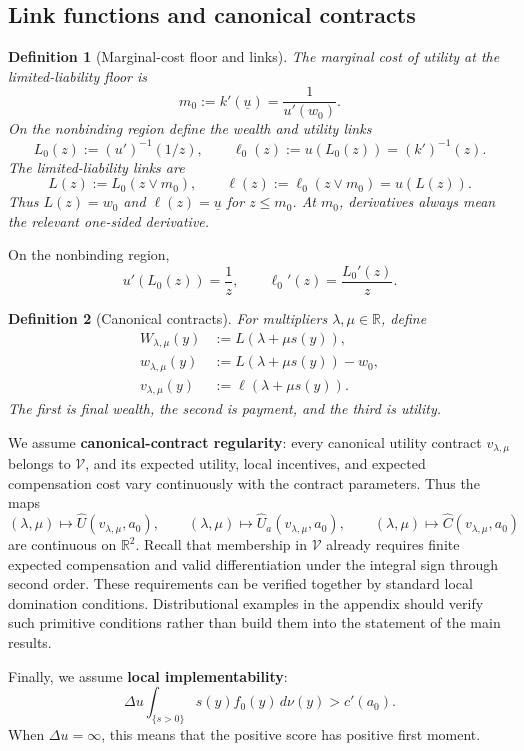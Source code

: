 \documentclass[11pt]{article}
\newtheorem{definition}{Definition}
\theoremstyle{remark}
\newcommand{\R}{\mathbb R}
\newcommand{\dd}{\,d\nu}
\begin{document}
\subsection{Link functions and canonical contracts}

\begin{definition}[Marginal-cost floor and links]
The marginal cost of utility at the limited-liability floor is
\[
 m_0:=k'(\underline u)=\frac{1}{u'(w_0)}.
\]
On the nonbinding region define the wealth and utility links
\[
 L_0(z):=(u')^{-1}(1/z),
 \qquad
 \ell_0(z):=u(L_0(z))=(k')^{-1}(z).
\]
The limited-liability links are
\[
 L(z):=L_0(z\vee m_0),
 \qquad
 \ell(z):=\ell_0(z\vee m_0)=u(L(z)).
\]
Thus $L(z)=w_0$ and $\ell(z)=\underline u$ for $z\le m_0$.
At $m_0$, derivatives always mean the relevant one-sided derivative.
\end{definition}

On the nonbinding region,
\[
 u'(L_0(z))=\frac1z,
 \qquad
 \ell_0'(z)=\frac{L_0'(z)}{z}.
\]

\begin{definition}[Canonical contracts]
For multipliers $\lambda,\mu\in\R$, define
\begin{align*}
 W_{\lambda,\mu}(y)&:=L(\lambda+\mu s(y)),\\
 w_{\lambda,\mu}(y)&:=L(\lambda+\mu s(y))-w_0,\\
 v_{\lambda,\mu}(y)&:=\ell(\lambda+\mu s(y)).
\end{align*}
The first is final wealth, the second is payment, and the third is utility.
\end{definition}

We assume \textbf{canonical-contract regularity}: every canonical utility
contract $v_{\lambda,\mu}$ belongs to $\mathcal V$, and its expected utility,
local incentives, and expected compensation cost vary continuously with the
contract parameters.  Thus the maps
\[
 (\lambda,\mu)\longmapsto \widehat U(v_{\lambda,\mu},a_0),
 \qquad
 (\lambda,\mu)\longmapsto \widehat U_a(v_{\lambda,\mu},a_0),
 \qquad
 (\lambda,\mu)\longmapsto \widehat C(v_{\lambda,\mu},a_0)
\]
are continuous on $\R^2$.  Recall that membership in $\mathcal V$ already
requires finite expected compensation and valid differentiation under the
integral sign through second order.  These requirements can be verified together
by standard local domination conditions.  Distributional examples in the
appendix should verify such primitive conditions rather than build them into the
statement of the main results.

Finally, we assume \textbf{local implementability}:
\begin{equation}
 \Delta u\int_{\{s>0\}}s(y)f_0(y)\dd(y)>c'(a_0).
 \tag{Imp}\label{eq:implementability}
\end{equation}
When $\Delta u=\infty$, this means that the positive score has positive first
moment.
\end{document}
